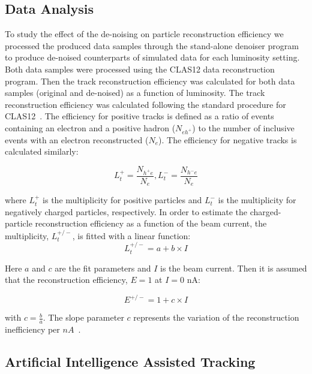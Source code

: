 \subsection{Data Analysis}

To study the effect of the de-noising on particle reconstruction efficiency we processed the produced data samples through the stand-alone denoiser program to produce de-noised counterparts of simulated data for each luminosity setting.  Both data samples were processed using the CLAS12 data reconstruction program. Then the track reconstruction efficiency was calculated for both data samples (original and de-noised) as a function of luminosity. The track reconstruction efficiency was calculated following the standard procedure for CLAS12~\cite{Stepanyan:2020bg}. The efficiency for positive tracks is defined as a ratio of 
events containing an electron and a positive hadron ($N_{eh^+}$) to the number of inclusive events with an electron reconstructed ($N_{e}$). The efficiency for negative tracks is calculated similarly:

\begin{equation}
L_t^+ = \frac{N_{h^+e}}{N_e} , L_t^- = \frac{N_{h^-e}}{N_e} 
\label{eq::eff}
\end{equation}

where $L_t^+$ is the multiplicity for positive particles and $L_t^-$ is the multiplicity for negatively
charged particles, respectively. In order to estimate the charged-particle reconstruction efficiency
as a function of the beam current, the multiplicity, $L_t^{+/-}$, is fitted with a linear function:
\begin{equation}
L_t^{+/-} = a + b\times I
\label{eq::eff2}
\end{equation}

Here $a$ and $c$ are the fit parameters and $I$ is the beam current. Then it is assumed that the
reconstruction efficiency, $E=1$ at $I=0$ nA:

\begin{equation}
E^{+/-} = 1 + c \times I
\label{eq::eff3}
\end{equation}

with $c=\frac{b}{a}$. The slope parameter $c$ represents the variation of the reconstruction
inefficiency per $nA$~\cite{Stepanyan:2020bg}.

\subsection{Artificial Intelligence Assisted Tracking}

